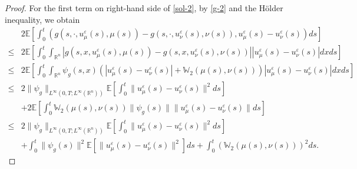\documentclass[11pt]{article}
\numberwithin{equation}{section}
\theoremstyle{plain}
\def\leq{\leqslant}
\begin{document}
\begin{proof}
 For the first term on right-hand side of \eqref{sol-2},
 by \eqref{g-2} and the H\"{o}lder inequality, we obtain
\begin{align} \label{sol-4}
       & 2 \mathbb{E}
              \left[ \int_0^t
                      \left( g(s, \cdot, u_\mu^\varepsilon (s), \mu(s) )
                             - g(s, \cdot, u_\nu^\varepsilon (s), \nu(s) ),
                             u_\mu^\varepsilon (s)
                              - u_\nu^\varepsilon (s)
                      \right) ds
              \right]  \nonumber \\
  \leq & 2 \mathbb{E}
              \left[ \int_0^t \int_{\mathbb{R}^n}
                      \left| g(s, x, u_\mu^\varepsilon (s), \mu(s) )
                             - g(s, x, u_\nu^\varepsilon (s), \nu(s) )
                      \right|
                      \left| u_\mu^\varepsilon (s)
                              - u_\nu^\varepsilon (s)
                      \right| dx ds
              \right]  \nonumber \\
  \leq & 2 \mathbb{E}
              \left[ \int_0^t \int_{\mathbb{R}^n}
                                     \psi_g(s,x)
                                     \left( | u_\mu^\varepsilon (s) - u_\nu^\varepsilon (s) |
                                             + \mathbb{W}_2 \left( \mu(s), \nu(s) \right)
                                     \right)
                                     | u_\mu^\varepsilon (s) - u_\nu^\varepsilon (s) |
                       dx ds
              \right]  \nonumber \\
  \leq & 2 \| \psi_g \|_{L^\infty(0,T; L^\infty(\mathbb{R}^n) ) }
         \mathbb{E}
              \left[ \int_0^t
                              \| u_\mu^\varepsilon (s) - u_\nu^\varepsilon (s) \|^2
                      ds
              \right]   \nonumber \\
       & + 2 \mathbb{E}
              \left[
                     \int_0^t \mathbb{W}_2 \left( \mu(s), \nu(s) \right)
                                     \| \psi_g(s) \|
                                     \| u_\mu^\varepsilon (s) - u_\nu^\varepsilon (s) \|
                      ds
              \right]  \nonumber \\
  \leq & 2 \| \psi_g \|_{L^\infty(0,T; L^\infty(\mathbb{R}^n) ) }
         \mathbb{E}
              \left[ \int_0^t
                              \| u_\mu^\varepsilon (s) - u_\nu^\varepsilon (s) \|^2
                      ds
              \right]   \nonumber \\
       & + \int_0^t \| \psi_g(s) \|^2
                   \mathbb{E}
                             \left[
                                    \| u_\mu^\varepsilon (s) - u_\nu^\varepsilon (s) \|^2
                             \right]
            ds
         + \int_0^t
                    \left( \mathbb{W}_2 \left( \mu(s), \nu(s) \right)
                    \right)^2
            ds.
\end{align}


\end{proof}
\end{document}

